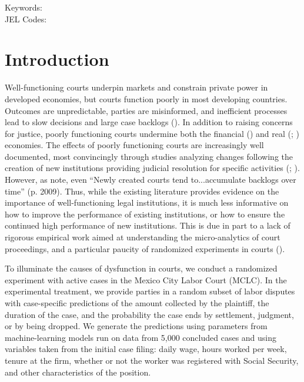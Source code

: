 \documentclass[11pt, a4paper]{article}
\begin{document}
\noindent Keywords:  \\
\noindent JEL Codes: 





\newpage


\section{Introduction}

Well-functioning courts underpin markets and constrain private power in developed economies, but courts function poorly in most developing countries. Outcomes are unpredictable, parties are misinformed, and inefficient processes lead to slow decisions and large case backlogs  (\cite{Djankov_Courts}). In addition to raising concerns for justice, poorly functioning courts undermine both the financial (\cite{PonticelliAlencar_Bankrupcy}) and real (\cite{10.1093/qje/qjaa020}; \cite{Chemin_ReStat}) economies. 
The effects of poorly functioning courts are increasingly well documented, most convincingly through studies analyzing changes following the creation of new institutions providing judicial resolution for specific activities (\cite{Visaria_AEJAp2009}; \cite{Lichand_2014}). However, as \cite{10.1093/qje/qjaa020} note, even ``Newly created courts tend to...accumulate backlogs over time'' (p. 2009). Thus, while the existing literature provides evidence on the importance of well-functioning legal institutions, it is much less informative on how to improve the performance of existing institutions, or how to ensure the continued high performance of new institutions. This is due in part to a lack of rigorous empirical work aimed at understanding the micro-analytics of court proceedings, and a particular paucity of randomized experiments in courts (\cite{Greiner_Matthews_Review2016}).  %


To illuminate the causes of dysfunction in courts, we conduct a randomized experiment with active cases in the Mexico City Labor Court (MCLC). In the experimental treatment, we provide parties in a random subset of labor disputes with case-specific predictions of the amount collected by the plaintiff, the duration of the case, and the probability the case ends by settlement, judgment, or by being dropped. We generate the predictions using parameters from machine-learning models run on data from 5,000 concluded cases and using variables taken from the initial case filing: daily wage, hours worked per week, tenure at the firm, whether or not the worker was registered with Social Security, and other characteristics of the position.  
\end{document}
